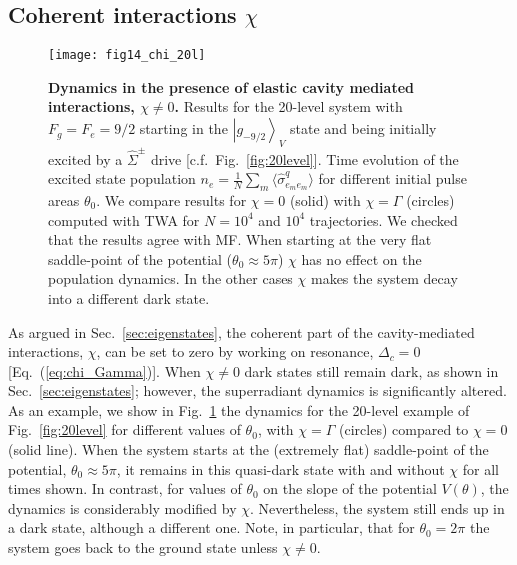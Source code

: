 \documentclass[aps,prx,superscriptaddress,twocolumn,notitlepage,nofootinbib,longbibliography]{revtex4-2}
\newcommand{\ket}[1]{\left|#1\right>}
\newcommand{\qusub}{q}
\begin{document}

\subsection{Coherent interactions \texorpdfstring{$\chi$}{chi}\label{ssec:chi}}

\begin{figure}[t]
\centering
\texttt{[image: fig14\_chi\_20l]}
\caption{\textbf{Dynamics in the presence of elastic cavity mediated interactions, $\chi\neq 0$.} Results for the 20-level system with $F_g=F_e=9/2$ starting in the $\ket{g_{-9/2}}_V$ state and being initially excited by a $\hat{\Sigma}^\pm$ drive [c.f.~Fig.~\ref{fig:20level}]. Time evolution of the excited state population $n_e = \frac{1}{N} \sum_m \langle \hat{\sigma}^{\qusub}_{e_me_m}\rangle$ for different initial pulse areas $\theta_0$. We compare results for $\chi=0$ (solid) with $\chi=\Gamma$ (circles) computed with TWA for $N=10^4$ and $10^4$ trajectories. We checked that the results agree with MF. When starting at the very flat saddle-point of the potential ($\theta_0\approx 5\pi$) $\chi$ has no effect on the population dynamics. In the other cases $\chi$ makes the system decay into a different dark state.}
\label{fig:chi}
\end{figure}

As argued in Sec.~\ref{sec:eigenstates}, the coherent part of the cavity-mediated interactions, $\chi$, can be set to zero by working on resonance, $\Delta_c=0$ [Eq.~(\ref{eq:chi_Gamma})].
When $\chi\neq0$ dark states still remain dark, as shown in Sec.~\ref{sec:eigenstates}; however, the superradiant dynamics is significantly altered.
As an example, we show in Fig.~\ref{fig:chi} the dynamics for the 20-level example of Fig.~\ref{fig:20level} for different values of $\theta_0$, with $\chi=\Gamma$ (circles) compared to $\chi=0$ (solid line). When the system starts at the (extremely flat) saddle-point of the potential, $\theta_0\approx 5\pi$, it remains in this quasi-dark state with and without $\chi$ for all times shown. In contrast, for values of $\theta_0$ on the slope of the potential $V(\theta)$, the dynamics is considerably modified by $\chi$. Nevertheless, the system still ends up in a dark state, although a different one. Note, in particular, that for $\theta_0 = 2\pi$ the system goes back to the ground state unless $\chi\neq0$.
\end{document}
